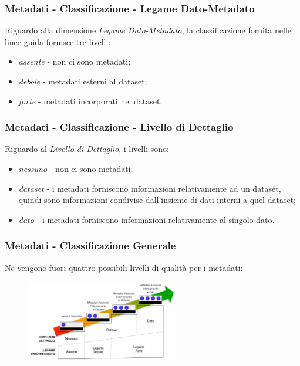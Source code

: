 \documentclass[8pt]{beamer}
\begin{document}
\begin{frame}
  \frametitle{Metadati - Classificazione - Legame Dato-Metadato}

  Riguardo alla dimensione \emph{Legame Dato-Metadato}, la classificazione fornita nelle
  linee guida fornisce tre livelli:
  \vspace{\baselineskip}
  
  \begin{itemize}[<+->]
   \item \emph{assente} - non ci sono metadati;
   \item \emph{debole} - metadati esterni al dataset; 
   \item \emph{forte} - metadati incorporati nel dataset. 
  \end{itemize}
\end{frame}

\begin{frame}
  \frametitle{Metadati - Classificazione - Livello di Dettaglio}

  Riguardo al \emph{Livello di Dettaglio}, i livelli sono:
  \vspace{\baselineskip}
  
  \begin{itemize}[<+->]
   \item \emph{nessuno} - non ci sono metadati;
   \item \emph{dataset} - i metadati forniscono informazioni relativamente ad un dataset, quindi sono informazioni
condivise dall'insieme di dati interni a quel dataset; 
   \item \emph{dato} - i metadati forniscono informazioni relativamente al singolo dato.
  \end{itemize}
\end{frame}

\begin{frame}
  \frametitle{Metadati - Classificazione Generale}

  Ne vengono fuori quattro possibili livelli di qualit\`a per i metadati:
  \vspace{\baselineskip}  
  
  \begin{figure}
     \includegraphics[width=250px]{metadati_classificazione.png} 
  \end{figure}
\end{frame}
\end{document}
